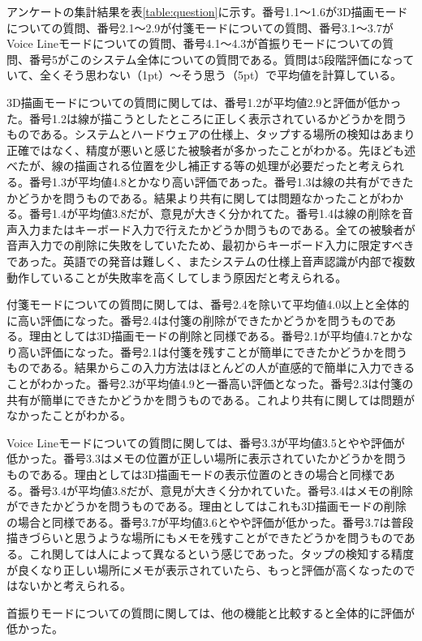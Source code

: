 \documentclass[11pt,a4j, titlepage]{jarticle} %
\begin{document}
アンケートの集計結果を表\ref{table:question}に示す。番号1.1～1.6が3D描画モードについての質問、番号2.1～2.9が付箋モードについての質問、番号3.1～3.7がVoice Lineモードについての質問、番号4.1～4.3が首振りモードについての質問、番号5がこのシステム全体についての質問である。質問は5段階評価になっていて、全くそう思わない（1pt）～そう思う（5pt）で平均値を計算している。

3D描画モードについての質問に関しては、番号1.2が平均値2.9と評価が低かった。番号1.2は線が描こうとしたところに正しく表示されているかどうかを問うものである。システムとハードウェアの仕様上、タップする場所の検知はあまり正確ではなく、精度が悪いと感じた被験者が多かったことがわかる。先ほども述べたが、線の描画される位置を少し補正する等の処理が必要だったと考えられる。番号1.3が平均値4.8とかなり高い評価であった。番号1.3は線の共有ができたかどうかを問うものである。結果より共有に関しては問題なかったことがわかる。番号1.4が平均値3.8だが、意見が大きく分かれてた。番号1.4は線の削除を音声入力またはキーボード入力で行えたかどうか問うものである。全ての被験者が音声入力での削除に失敗をしていたため、最初からキーボード入力に限定すべきであった。英語での発音は難しく、またシステムの仕様上音声認識が内部で複数動作していることが失敗率を高くしてしまう原因だと考えられる。

付箋モードについての質問に関しては、番号2.4を除いて平均値4.0以上と全体的に高い評価になった。番号2.4は付箋の削除ができたかどうかを問うものである。理由としては3D描画モードの削除と同様である。番号2.1が平均値4.7とかなり高い評価になった。番号2.1は付箋を残すことが簡単にできたかどうかを問うものである。結果からこの入力方法はほとんどの人が直感的で簡単に入力できることがわかった。番号2.3が平均値4.9と一番高い評価となった。番号2.3は付箋の共有が簡単にできたかどうかを問うものである。これより共有に関しては問題がなかったことがわかる。

Voice Lineモードについての質問に関しては、番号3.3が平均値3.5とやや評価が低かった。番号3.3はメモの位置が正しい場所に表示されていたかどうかを問うものである。理由としては3D描画モードの表示位置のときの場合と同様である。番号3.4が平均値3.8だが、意見が大きく分かれていた。番号3.4はメモの削除ができたかどうかを問うものである。理由としてはこれも3D描画モードの削除の場合と同様である。番号3.7が平均値3.6とやや評価が低かった。番号3.7は普段描きづらいと思うような場所にもメモを残すことができたどうかを問うものである。これ関しては人によって異なるという感じであった。タップの検知する精度が良くなり正しい場所にメモが表示されていたら、もっと評価が高くなったのではないかと考えられる。

首振りモードについての質問に関しては、他の機能と比較すると全体的に評価が低かった。
\end{document}
